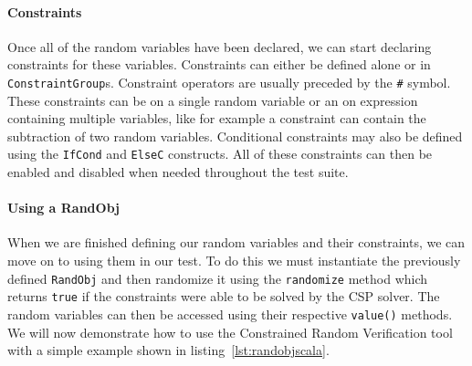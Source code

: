 \documentclass[conference]{IEEEtran}
\begin{document}
\paragraph{Constraints} Once all of the random variables have been declared, we can start declaring constraints for these variables. Constraints can either be defined alone or in \texttt{ConstraintGroup}s. Constraint operators are usually preceded by the \texttt{\#} symbol. These constraints can be on a single random variable or an on expression containing multiple variables, like for example a constraint can contain the subtraction of two random variables. Conditional constraints may also be defined using the \texttt{IfCond} and \texttt{ElseC} constructs. All of these constraints can then be enabled and disabled when needed throughout the test suite.

\paragraph{Using a RandObj} When we are finished defining our random variables and their constraints, we can move on to using them in our test. To do this we must instantiate the previously defined \texttt{RandObj} and then randomize it using the \texttt{randomize} method which returns \texttt{true} if the constraints were able to be solved by the CSP solver. The random variables can then be accessed using their respective \texttt{value()} methods. We will now demonstrate how to use the Constrained Random Verification tool with a simple example shown in listing~\ref{lst:randobjscala}.

\end{document}
